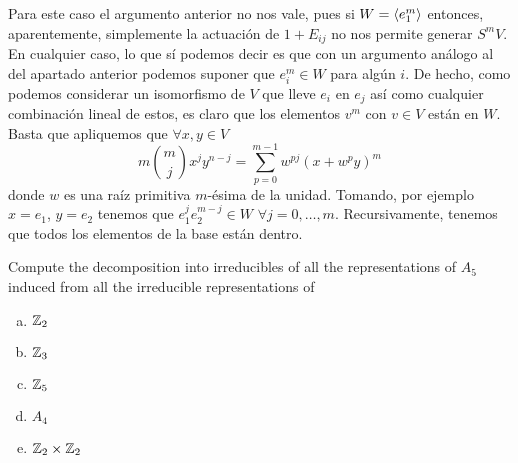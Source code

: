 \documentclass[twoside]{article}
\begin{document}
\begin{solucion}
Para este caso el argumento anterior no nos vale, pues si $W=\langle{e_1^m}\rangle$ entonces, aparentemente, simplemente la actuación de $1+E_{ij}$ no nos permite generar $S^m V$. En cualquier caso, lo que sí podemos decir es que con un argumento análogo al del apartado anterior podemos suponer que $e_i^m \in W$ para algún $i$. De hecho, como podemos considerar un isomorfismo de $V$ que lleve $e_i$ en $e_j$ así como cualquier combinación lineal de estos, es claro que los elementos $v^m$ con $v\in V$ están en $W$. Basta que apliquemos que $\forall x,y \in V$
$$
m\binom{m}{j}x^jy^{n-j} = \sum_{p=0}^{m-1}w^{pj}(x+w^py)^m 
$$ 
donde $w$ es una raíz primitiva $m$-ésima de la unidad. Tomando, por ejemplo $x=e_1$, $y=e_2$ tenemos que $e_1^j e_2^{m-j} \in W$ $\forall j=0,\dotsc, m$. Recursivamente, tenemos que todos los elementos de la base están dentro.
\end{solucion}


\begin{ejercicio}{4.34}
Compute the decomposition into irreducibles of all the representations of $A_5$ induced
from all the irreducible representations of
\begin{enumerate}[(a)]
\item $\mathbb{Z}_2$
\item $\mathbb{Z}_3$
\item $\mathbb{Z}_5$
\item $A_4$
\item $\mathbb{Z}_2\times\mathbb{Z}_2$
\end{enumerate}
\end{ejercicio}
\end{document}
